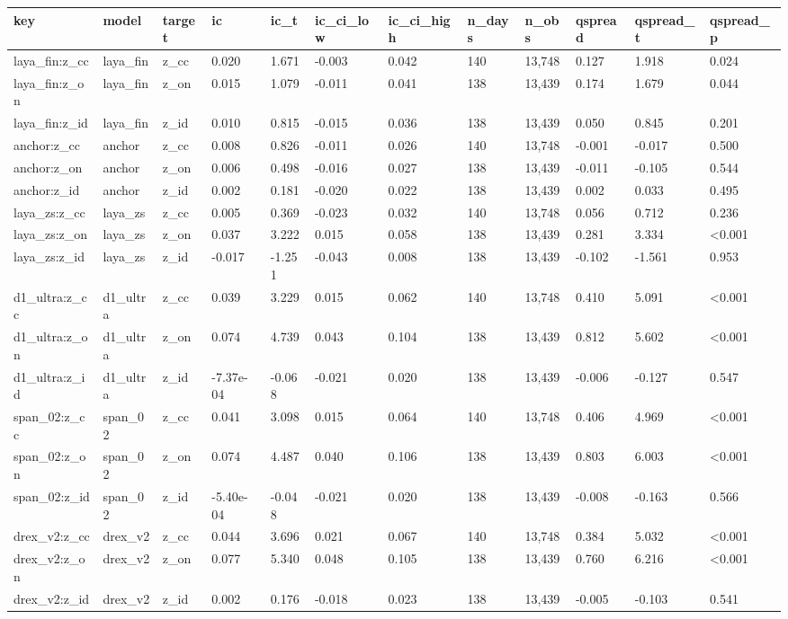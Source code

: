 \begin{tabular}{llllllllllll}
\toprule
key & model & target & ic & ic\_t & ic\_ci\_low & ic\_ci\_high & n\_days & n\_obs & qspread & qspread\_t & qspread\_p \\
\midrule
laya\_fin:z\_cc & laya\_fin & z\_cc & 0.020 & 1.671 & -0.003 & 0.042 & 140 & 13,748 & 0.127 & 1.918 & 0.024 \\
laya\_fin:z\_on & laya\_fin & z\_on & 0.015 & 1.079 & -0.011 & 0.041 & 138 & 13,439 & 0.174 & 1.679 & 0.044 \\
laya\_fin:z\_id & laya\_fin & z\_id & 0.010 & 0.815 & -0.015 & 0.036 & 138 & 13,439 & 0.050 & 0.845 & 0.201 \\
anchor:z\_cc & anchor & z\_cc & 0.008 & 0.826 & -0.011 & 0.026 & 140 & 13,748 & -0.001 & -0.017 & 0.500 \\
anchor:z\_on & anchor & z\_on & 0.006 & 0.498 & -0.016 & 0.027 & 138 & 13,439 & -0.011 & -0.105 & 0.544 \\
anchor:z\_id & anchor & z\_id & 0.002 & 0.181 & -0.020 & 0.022 & 138 & 13,439 & 0.002 & 0.033 & 0.495 \\
laya\_zs:z\_cc & laya\_zs & z\_cc & 0.005 & 0.369 & -0.023 & 0.032 & 140 & 13,748 & 0.056 & 0.712 & 0.236 \\
laya\_zs:z\_on & laya\_zs & z\_on & 0.037 & 3.222 & 0.015 & 0.058 & 138 & 13,439 & 0.281 & 3.334 & <0.001 \\
laya\_zs:z\_id & laya\_zs & z\_id & -0.017 & -1.251 & -0.043 & 0.008 & 138 & 13,439 & -0.102 & -1.561 & 0.953 \\
d1\_ultra:z\_cc & d1\_ultra & z\_cc & 0.039 & 3.229 & 0.015 & 0.062 & 140 & 13,748 & 0.410 & 5.091 & <0.001 \\
d1\_ultra:z\_on & d1\_ultra & z\_on & 0.074 & 4.739 & 0.043 & 0.104 & 138 & 13,439 & 0.812 & 5.602 & <0.001 \\
d1\_ultra:z\_id & d1\_ultra & z\_id & -7.37e-04 & -0.068 & -0.021 & 0.020 & 138 & 13,439 & -0.006 & -0.127 & 0.547 \\
span\_02:z\_cc & span\_02 & z\_cc & 0.041 & 3.098 & 0.015 & 0.064 & 140 & 13,748 & 0.406 & 4.969 & <0.001 \\
span\_02:z\_on & span\_02 & z\_on & 0.074 & 4.487 & 0.040 & 0.106 & 138 & 13,439 & 0.803 & 6.003 & <0.001 \\
span\_02:z\_id & span\_02 & z\_id & -5.40e-04 & -0.048 & -0.021 & 0.020 & 138 & 13,439 & -0.008 & -0.163 & 0.566 \\
drex\_v2:z\_cc & drex\_v2 & z\_cc & 0.044 & 3.696 & 0.021 & 0.067 & 140 & 13,748 & 0.384 & 5.032 & <0.001 \\
drex\_v2:z\_on & drex\_v2 & z\_on & 0.077 & 5.340 & 0.048 & 0.105 & 138 & 13,439 & 0.760 & 6.216 & <0.001 \\
drex\_v2:z\_id & drex\_v2 & z\_id & 0.002 & 0.176 & -0.018 & 0.023 & 138 & 13,439 & -0.005 & -0.103 & 0.541 \\
\bottomrule
\end{tabular}
